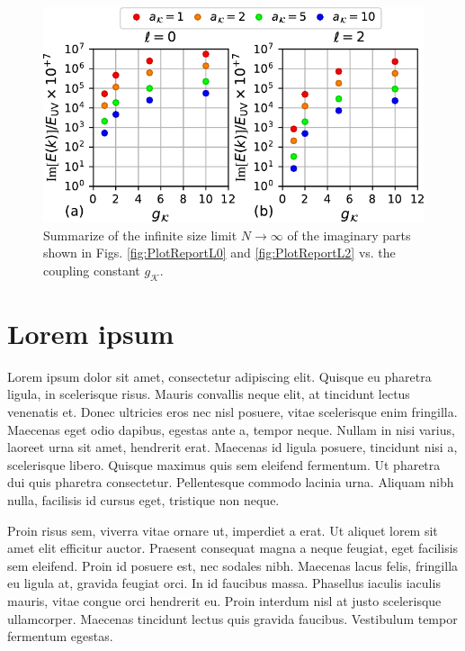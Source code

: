 \documentclass[english,aps,prd,nofootinbib,twocolumn]{revtex4-1}
\begin{document}
\begin{figure}
\centering
\includegraphics[scale=0.55]{./PlotReport/PlotReportTotal}
\caption{Summarize of the infinite size limit $N\rightarrow\infty$ of the imaginary parts shown in Figs. \ref{fig:PlotReportL0} and \ref{fig:PlotReportL2} vs. the coupling constant $g_{\mathcal{K}}$.}
\label{fig:PlotReport}
\end{figure}

\section{Lorem ipsum}

Lorem ipsum dolor sit amet, consectetur adipiscing elit. Quisque eu pharetra ligula, in scelerisque risus. Mauris convallis neque elit, at tincidunt lectus venenatis et. Donec ultricies eros nec nisl posuere, vitae scelerisque enim fringilla. Maecenas eget odio dapibus, egestas ante a, tempor neque. Nullam in nisi varius, laoreet urna sit amet, hendrerit erat. Maecenas id ligula posuere, tincidunt nisi a, scelerisque libero. Quisque maximus quis sem eleifend fermentum. Ut pharetra dui quis pharetra consectetur. Pellentesque commodo lacinia urna. Aliquam nibh nulla, facilisis id cursus eget, tristique non neque.

Proin risus sem, viverra vitae ornare ut, imperdiet a erat. Ut aliquet lorem sit amet elit efficitur auctor. Praesent consequat magna a neque feugiat, eget facilisis sem eleifend. Proin id posuere est, nec sodales nibh. Maecenas lacus felis, fringilla eu ligula at, gravida feugiat orci. In id faucibus massa. Phasellus iaculis iaculis mauris, vitae congue orci hendrerit eu. Proin interdum nisl at justo scelerisque ullamcorper. Maecenas tincidunt lectus quis gravida faucibus. Vestibulum tempor fermentum egestas.
\end{document}
